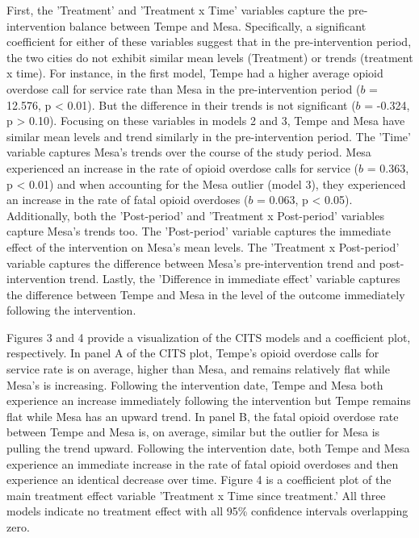 First, the 'Treatment' and 'Treatment x Time' variables capture the pre-intervention balance between Tempe and Mesa. Specifically, a significant coefficient for either of these variables suggest that in the pre-intervention period, the two cities do not exhibit similar mean levels (Treatment) or trends (treatment x time).  For instance, in the first model, Tempe had a higher average opioid overdose call for service rate than Mesa in the pre-intervention period (\(b\) = 12.576, p < 0.01). But the difference in their trends is not significant (\(b\) = -0.324, p > 0.10). Focusing on these variables in models 2 and 3, Tempe and Mesa have similar mean levels and trend similarly in the pre-intervention period. The 'Time' variable captures Mesa's trends over the course of the study period. Mesa experienced an increase in the rate of opioid overdose calls for service (\(b\) = 0.363, p < 0.01) and when accounting for the Mesa outlier (model 3), they experienced an increase in the rate of fatal opioid overdoses (\(b\) = 0.063, p < 0.05). Additionally, both the 'Post-period' and 'Treatment x Post-period' variables capture Mesa's trends too. The 'Post-period' variable captures the immediate effect of the intervention on Mesa's mean levels. The 'Treatment x Post-period' variable captures the difference between Mesa's pre-intervention trend and post-intervention trend. Lastly, the 'Difference in immediate effect' variable captures the difference between Tempe and Mesa in the level of the outcome immediately following the intervention.

Figures 3 and 4 provide a visualization of the CITS models and a coefficient plot, respectively. In panel A of the CITS plot, Tempe's opioid overdose calls for service rate is on average, higher than Mesa, and remains relatively flat while Mesa's is increasing. Following the intervention date, Tempe and Mesa both experience an increase immediately following the intervention but Tempe remains flat while Mesa has an upward trend. In panel B, the fatal opioid overdose rate between Tempe and Mesa is, on average, similar but the outlier for Mesa is pulling the trend upward. Following the intervention date, both Tempe and Mesa experience an immediate increase in the rate of fatal opioid overdoses and then experience an identical decrease over time. Figure 4 is a coefficient plot of the main treatment effect variable 'Treatment x Time since treatment.' All three models indicate no treatment effect with all 95\% confidence intervals overlapping zero.

